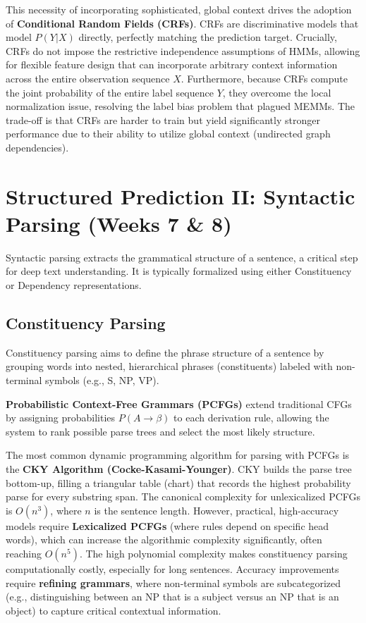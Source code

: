 \documentclass{article}
\begin{document}
This necessity of incorporating sophisticated, global context drives the adoption of \textbf{Conditional Random Fields (CRFs)}. CRFs are discriminative models that model $P(Y|X)$ directly, perfectly matching the prediction target. Crucially, CRFs do not impose the restrictive independence assumptions of HMMs, allowing for flexible feature design that can incorporate arbitrary context information across the entire observation sequence $X$. Furthermore, because CRFs compute the joint probability of the entire label sequence $Y$, they overcome the local normalization issue, resolving the label bias problem that plagued MEMMs. The trade-off is that CRFs are harder to train but yield significantly stronger performance due to their ability to utilize global context (undirected graph dependencies).

\section{Structured Prediction II: Syntactic Parsing (Weeks 7 \& 8)}

Syntactic parsing extracts the grammatical structure of a sentence, a critical step for deep text understanding. It is typically formalized using either Constituency or Dependency representations.

\subsection{Constituency Parsing}

Constituency parsing aims to define the phrase structure of a sentence by grouping words into nested, hierarchical phrases (constituents) labeled with non-terminal symbols (e.g., S, NP, VP).

\textbf{Probabilistic Context-Free Grammars (PCFGs)} extend traditional CFGs by assigning probabilities $P(A \rightarrow \beta)$ to each derivation rule, allowing the system to rank possible parse trees and select the most likely structure.

The most common dynamic programming algorithm for parsing with PCFGs is the \textbf{CKY Algorithm (Cocke-Kasami-Younger)}. CKY builds the parse tree bottom-up, filling a triangular table (chart) that records the highest probability parse for every substring span. The canonical complexity for unlexicalized PCFGs is $O(n^3)$, where $n$ is the sentence length. However, practical, high-accuracy models require \textbf{Lexicalized PCFGs} (where rules depend on specific head words), which can increase the algorithmic complexity significantly, often reaching $O(n^5)$. The high polynomial complexity makes constituency parsing computationally costly, especially for long sentences. Accuracy improvements require \textbf{refining grammars}, where non-terminal symbols are subcategorized (e.g., distinguishing between an NP that is a subject versus an NP that is an object) to capture critical contextual information.
\end{document}
